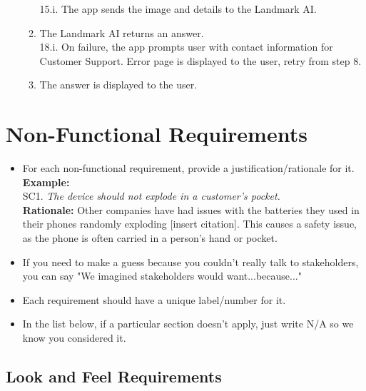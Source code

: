 \documentclass[]{article}
\begin{document}
\begin{enumerate}[{\bf BE1.}]
\begin{enumerate}[{1.}]
                        15.i. The app sends the image and details to the Landmark AI. 
                        \item The Landmark AI returns an answer. \\ 18.i. On failure, the app prompts user with contact information for Customer Support. Error page is displayed to the user, retry from step 8.
                        \item The answer is displayed to the user. 
                \end{enumerate}
	\end{enumerate}

\section{Non-Functional Requirements}
\label{sec:non-functional_requirements}


\begin{itemize}
	\item For each non-functional requirement, provide a justification/rationale for it.\\
	{\bf Example:} \\
	SC1. \emph{The device should not explode in a customer’s pocket.}\\
	{\bf Rationale:} Other companies have had issues with the batteries they used in their phones randomly exploding [insert citation]. This causes a safety issue, as the phone is often carried in a person's hand or pocket.	
	\item If you need to make a guess because you couldn't really talk to stakeholders, you can say "We imagined stakeholders would want...because..."
	\item Each requirement should have a unique label/number for it.
	\item In the list below, if a particular section doesn't apply, just write N/A so we know you considered it.
\end{itemize}

\subsection{Look and Feel Requirements}
\label{sub:look_and_feel_requirements}
\end{document}
